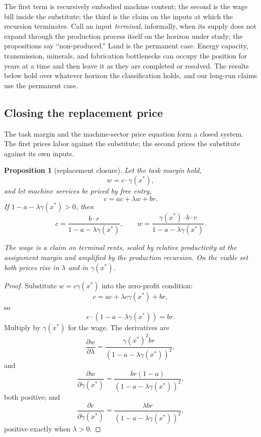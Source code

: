 \documentclass[12pt]{article}
\theoremstyle{plain}
\newtheorem{proposition}{Proposition}
\begin{document}
The first term is recursively embodied machine content; the second is the wage
bill inside the substitute; the third is the claim on the inputs at which the
recursion terminates. Call an input \emph{terminal}, informally, when its supply
does not expand through the production process itself on the horizon under
study; the propositions say ``non-produced.'' Land is the permanent case.
Energy capacity, transmission, minerals, and fabrication bottlenecks can occupy
the position for years at a time and then leave it as they are completed or
resolved. The results below hold over whatever horizon the classification holds,
and our long-run claims use the permanent case.


\subsection{Closing the replacement price}

The task margin and the machine-sector price equation form a closed system. The
first prices labor against the substitute; the second prices the substitute
against its own inputs.

\begin{proposition}[replacement closure]\label{prop:replacement}
Let the task margin hold,
\[
w = c\cdot\gamma(x^*),
\]
and let machine services be priced by free entry,
\[
c = ac + \lambda w + br.
\]
If $1-a-\lambda\gamma(x^*)>0$, then
\begin{equation}\label{eq:closure}
c =
\frac{b\cdot r}{1-a-\lambda\gamma(x^*)},
\qquad
w =
\frac{\gamma(x^*)\cdot b\cdot r}
     {1-a-\lambda\gamma(x^*)}.
\end{equation}

The wage is a claim on terminal rents, scaled by relative productivity at the
assignment margin and amplified by the production recursion. On the viable set
both prices rise in $\lambda$ and in $\gamma(x^*)$.
\end{proposition}

\begin{proof}
Substitute $w=c\gamma(x^*)$ into the zero-profit condition:
\[
c = ac + \lambda c\gamma(x^*) + br,
\]
so
\[
c\cdot(1-a-\lambda\gamma(x^*)) = br.
\]
Multiply by $\gamma(x^*)$ for the wage. The derivatives are
\[
\frac{\partial w}{\partial\lambda}
=
\frac{\gamma(x^*)^2br}
     {(1-a-\lambda\gamma(x^*))^2},
\]
and
\[
\frac{\partial w}{\partial\gamma(x^*)}
=
\frac{br(1-a)}
     {(1-a-\lambda\gamma(x^*))^2},
\]
both positive; and
\[
\frac{\partial c}{\partial\gamma(x^*)}
=
\frac{\lambda br}
     {(1-a-\lambda\gamma(x^*))^2},
\]
positive exactly when $\lambda>0$.
\end{proof}
\end{document}
